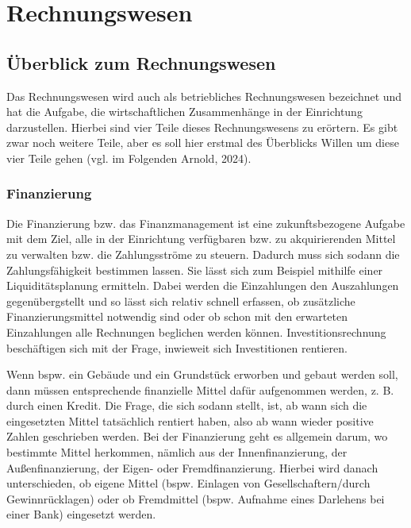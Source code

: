 \documentclass[
  letterpaper,
]{book}
\begin{document}
\section{Rechnungswesen}\label{rechnungswesen}

\subsection{Überblick zum
Rechnungswesen}\label{ueberblick-zum-rechnungswesen}

Das Rechnungswesen wird auch als betriebliches Rechnungswesen bezeichnet
und hat die Aufgabe, die wirtschaftlichen Zusammenhänge in der
Einrichtung darzustellen. Hierbei sind vier Teile dieses Rechnungswesens
zu erörtern. Es gibt zwar noch weitere Teile, aber es soll hier erstmal
des Überblicks Willen um diese vier Teile gehen (vgl. im Folgenden
Arnold, 2024).

\subsubsection{Finanzierung}\label{finanzierung}

Die Finanzierung bzw. das Finanzmanagement ist eine zukunftsbezogene
Aufgabe mit dem Ziel, alle in der Einrichtung verfügbaren bzw. zu
akquirierenden Mittel zu verwalten bzw. die Zahlungsströme zu steuern.
Dadurch muss sich sodann die Zahlungsfähigkeit bestimmen lassen. Sie
lässt sich zum Beispiel mithilfe einer Liquiditätsplanung ermitteln.
Dabei werden die Einzahlungen den Auszahlungen gegenübergstellt und so
lässt sich relativ schnell erfassen, ob zusätzliche Finanzierungsmittel
notwendig sind oder ob schon mit den erwarteten Einzahlungen alle
Rechnungen beglichen werden können. Investitionsrechnung beschäftigen
sich mit der Frage, inwieweit sich Investitionen rentieren.

Wenn bspw. ein Gebäude und ein Grundstück erworben und gebaut werden
soll, dann müssen entsprechende finanzielle Mittel dafür aufgenommen
werden, z. B. durch einen Kredit. Die Frage, die sich sodann stellt,
ist, ab wann sich die eingesetzten Mittel tatsächlich rentiert haben,
also ab wann wieder positive Zahlen geschrieben werden. Bei der
Finanzierung geht es allgemein darum, wo bestimmte Mittel herkommen,
nämlich aus der Innenfinanzierung, der Außenfinanzierung, der Eigen-
oder Fremdfinanzierung. Hierbei wird danach unterschieden, ob eigene
Mittel (bspw. Einlagen von Gesellschaftern/durch Gewinnrücklagen) oder
ob Fremdmittel (bspw. Aufnahme eines Darlehens bei einer Bank)
eingesetzt werden.
\end{document}

